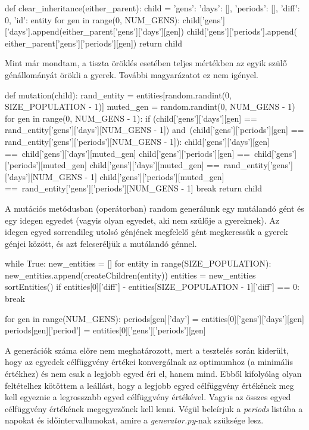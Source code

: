 \documentclass[12pt,a4paper]{report}
\begin{document}
\begin{python}
def clear_inheritance(either_parent):
    child = {'gens': {'days': [], 'periods': []}, 
             'diff': 0, 'id': entity}
    for gen in range(0, NUM_GENS):
        child['gens']['days'].append(either_parent['gens']['days'][gen])
        child['gens']['periods'].append(
            either_parent['gens']['periods'][gen])
    return child
\end{python}

Mint már mondtam, a tiszta öröklés esetében teljes mértékben az egyik szülő génállományát örökli a gyerek. További magyarázatot ez nem igényel.

\begin{python}
def mutation(child):
    rand_entity = entities[random.randint(0, SIZE_POPULATION - 1)]
    muted_gen = random.randint(0, NUM_GENS - 1)
    for gen in range(0, NUM_GENS - 1):
        if (child['gens']['days'][gen] ==
           rand_entity['gens']['days'][NUM_GENS - 1]) and\
           (child['gens']['periods'][gen] ==
           rand_entity['gens']['periods'][NUM_GENS - 1]):
            child['gens']['days'][gen] ==\
                child['gens']['days'][muted_gen]
            child['gens']['periods'][gen] ==\
                child['gens']['periods'][muted_gen]
            child['gens']['days'][muted_gen] ==\
                rand_entity['gens']['days'][NUM_GENS - 1]
            child['gens']['periods'][muted_gen] ==\
                rand_entity['gens']['periods'][NUM_GENS - 1]
            break
    return child
\end{python}

A mutációs metódusban (operátorban) random generálunk egy mutálandó gént és egy idegen egyedet (vagyis olyan egyedet, aki nem szülője a gyereknek). Az idegen egyed sorrendileg utolsó génjének megfelelő gént megkeressük a gyerek génjei között, és azt felcseréljük a mutálandó génnel.

\begin{python}
while True:
    new_entities = []
    for entity in range(SIZE_POPULATION):
        new_entities.append(createChildren(entity))
    entities = new_entities
    sortEntities()
    if entities[0]['diff'] - entities[SIZE_POPULATION - 1]['diff'] == 0:
        break

for gen in range(NUM_GENS):
    periods[gen]['day'] = entities[0]['gens']['days'][gen]
    periods[gen]['period'] = entities[0]['gens']['periods'][gen]
\end{python}

A generációk száma előre nem meghatározott, mert a tesztelés során kiderült, hogy az egyedek célfüggvény értékei konvergálnak az optimumhoz (a minimális értékhez) és nem csak a legjobb egyed éri el, hanem mind. Ebből kifolyólag olyan feltételhez kötöttem a leállást, hogy a legjobb egyed célfüggvény értékének meg kell egyeznie a legrosszabb egyed célfüggvény értékével. Vagyis az összes egyed célfüggvény értékének megegyezőnek kell lenni. Végül beleírjuk a \textit{periods} listába a napokat és időintervallumokat, amire a \textit{generator.py}-nak szüksége lesz.
\end{document}
